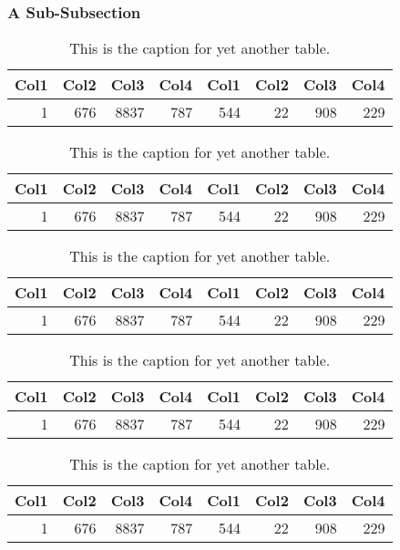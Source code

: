 \subsubsection{A Sub-Subsection}
\lipsum[6-8]
\begin{table}
	\centering
	\begin{tabular}{r r r r r r r r}
		Col1 & Col2 & Col3 & Col4 & Col1 & Col2 & Col3 & Col4 \\
		\hline
		1    & 676  & 8837 & 787  & 544  & 22   & 908  & 229  \\
		\hline
	\end{tabular}
	\caption{This is the caption for yet another table.}
\end{table}
\begin{table}
	\centering
	\begin{tabular}{r r r r r r r r}
		Col1 & Col2 & Col3 & Col4 & Col1 & Col2 & Col3 & Col4 \\
		\hline
		1    & 676  & 8837 & 787  & 544  & 22   & 908  & 229  \\
		\hline
	\end{tabular}
	\caption{This is the caption for yet another table.}
\end{table}
\begin{table}
	\centering
	\begin{tabular}{r r r r r r r r}
		Col1 & Col2 & Col3 & Col4 & Col1 & Col2 & Col3 & Col4 \\
		\hline
		1    & 676  & 8837 & 787  & 544  & 22   & 908  & 229  \\
		\hline
	\end{tabular}
	\caption{This is the caption for yet another table.}
\end{table}
\begin{table}
	\centering
	\begin{tabular}{r r r r r r r r}
		Col1 & Col2 & Col3 & Col4 & Col1 & Col2 & Col3 & Col4 \\
		\hline
		1    & 676  & 8837 & 787  & 544  & 22   & 908  & 229  \\
		\hline
	\end{tabular}
	\caption{This is the caption for yet another table.}
\end{table}
\begin{table}
	\centering
	\begin{tabular}{r r r r r r r r}
		Col1 & Col2 & Col3 & Col4 & Col1 & Col2 & Col3 & Col4 \\
		\hline
		1    & 676  & 8837 & 787  & 544  & 22   & 908  & 229  \\
		\hline
	\end{tabular}
	\caption{This is the caption for yet another table.}
\end{table}

